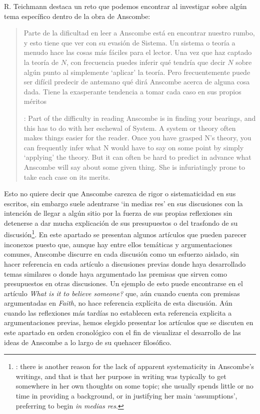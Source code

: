 R. Teichmann destaca un reto que podemos encontrar al investigar sobre algún tema específico dentro de la obra de Anscombe:
\blockquote[{\Cite[1]{teichmann2008ans}}: Part of the difficulty in reading Anscombe is in finding your bearings, and this has to do with her eschewal of System. A system or theory often makes things easier for the reader. Once you have grasped N's theory, you can frequently infer what N would have to say on some point by simply `applying' the theory. But it can often be hard to predict in advance what Anscombe will say about some given thing. She is infuriatingly prone to take each case on its merits.]
{Parte de la dificultad en leer a Anscombe está en encontrar nuestro rumbo, y esto tiene que ver con su evasión de Sistema. Un sistema o teoría a menudo hace las cosas más fáciles para el lector. Una vez que haz captado la teoría de $N$, con frecuencia puedes inferir qué tendría que decir $N$ sobre algún punto al simplemente \enquote*{aplicar} la teoría. Pero frecuentemente puede ser difícil predecir de antemano qué dirá Anscombe acerca de alguna cosa dada. Tiene la exasperante tendencia a tomar cada caso en sus propios méritos}. 
Esto no quiere decir que Anscombe carezca de rigor o sistematicidad en sus escritos, sin embargo suele adentrarse \enquote*{in medias res} en sus discusiones con la intención de llegar a algún sitio por la fuerza de sus propias reflexiones sin detenerse a dar mucha explicación de sus presupuestos o del trasfondo de su discusión\footnote{\Cite[Cf.][1]{teichmann2008ans}: \textelp{} there is another reason for the lack of apparent systematicity in Anscombe's writings, and that is that her purpose in writing was typically to get somewhere in her own thoughts on some topic; she usually spends little or no time in providing a background, or in justifying her main `assumptions', preferring to begin \emph{in medias res}.}.
En este apartado se presentan algunos artículos que pueden parecer inconexos puesto que, aunque hay entre ellos temáticas y argumentaciones comunes, Anscombe discurre en cada discusión como un esfuerzo aislado, sin hacer referencia en cada artículo a discusiones previas donde haya desarrollado temas similares o donde haya argumentado las premisas que sirven como presupuestos en otras discusiones. Un ejemplo de esto puede encontrarse en el artículo \emph{What is it to believe someone?} que, aún cuando cuenta con premisas argumentadas en \emph{Faith}, no hace referencia explícita de esta discusión. Aún cuando las reflexiones más tardías no establecen esta referencia explicita a argumentaciones previas, hemos elegido presentar los artículos que se discuten en este apartado en orden cronológico con el fin de visualizar el desarrollo de las ideas de Anscombe a lo largo de su quehacer filosófico. 

